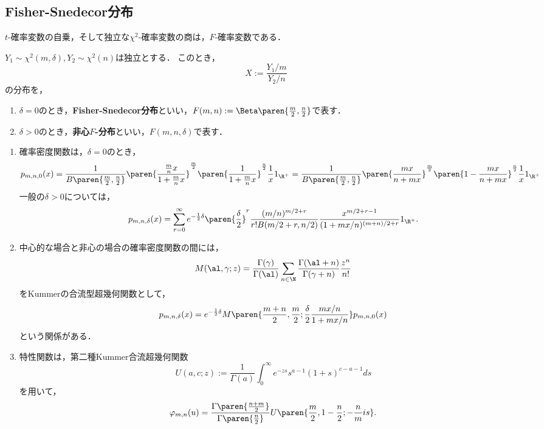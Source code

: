 \documentclass[uplatex,dvipdfmx]{jsreport}
\begin{document}
\subsection{Fisher-Snedecor分布}

\begin{tcolorbox}[colframe=ForestGreen, colback=ForestGreen!10!white,breakable,colbacktitle=ForestGreen!40!white,coltitle=black,fonttitle=\bfseries\sffamily,
title=]
    $t$-確率変数の自乗，そして独立な$\chi^2$-確率変数の商は，$F$-確率変数である．
\end{tcolorbox}

\begin{definition}
    $Y_1\sim\chi^2(m,\delta),Y_2\sim\chi^2(n)$は独立とする．
    このとき，
    \[X:=\frac{Y_1/m}{Y_2/n}\]
    の分布を，
    \begin{enumerate}
        \item $\delta=0$のとき，\textbf{Fisher-Snedecor分布}といい，$F(m,n):=\Beta\paren{\frac{m}{2},\frac{n}{2}}$で表す．
        \item $\delta>0$のとき，\textbf{非心$F$-分布}といい，$F(m,n,\delta)$で表す．
    \end{enumerate}
\end{definition}

\begin{proposition}[F-分布の特性値]\mbox{}
    \begin{enumerate}
        \item 確率密度関数は，$\delta=0$のとき，
        \[p_{m,n,0}(x)=\frac{1}{B\paren{\frac{m}{2},\frac{n}{2}}}\paren{\frac{\frac{m}{n}x}{1+\frac{m}{n}x}}^{\frac{m}{2}}\paren{\frac{1}{1+\frac{m}{n}x}}^{\frac{n}{2}}\frac{1}{x}1_{\R^+}=\frac{1}{B\paren{\frac{m}{2},\frac{n}{2}}}\paren{\frac{mx}{n+mx}}^{\frac{m}{2}}\paren{1-\frac{mx}{n+mx}}^{\frac{n}{2}}\frac{1}{x}1_{\R^+}\]
        一般の$\delta>0$については，
        \[p_{m,n,\delta}(x)=\sum_{r=0}^\infty e^{-\frac{1}{2}\delta}\paren{\frac{\delta}{2}}^r\frac{(m/n)^{m/2+r}}{r!B(m/2+r,n/2)}\frac{x^{m/2+r-1}}{(1+mx/n)^{(m+n)/2+r}}1_{\R^+}.\]
        \item 中心的な場合と非心の場合の確率密度関数の間には，
        \[M(\al,\gamma;z)=\frac{\Gamma(\gamma)}{\Gamma(\al)}\sum_{n\in\N}\frac{\Gamma(\al+n)}{\Gamma(\gamma+n)}\frac{z^n}{n!}\]
        をKummerの合流型超幾何関数として，
        \[p_{m,n,\delta}(x)=e^{-\frac{1}{2}\delta}M\paren{\frac{m+n}{2},\frac{m}{2};\frac{\delta}{2}\frac{mx/n}{1+mx/n}}p_{m,n,0}(x)\]
        という関係がある．
        \item 特性関数は，第二種Kummer合流超幾何関数
        \[U(a,c;z):=\frac{1}{\Gamma(a)}\int^\infty_0e^{-zs}s^{a-1}(1+s)^{c-a-1}ds\]
        を用いて，
        \[\varphi_{m,n}(u)=\frac{\Gamma\paren{\frac{n+m}{2}}}{\Gamma\paren{\frac{n}{2}}}U\paren{\frac{m}{2},1-\frac{n}{2};-\frac{n}{m}is}.\]
    \end{enumerate}
\end{proposition}
\end{document}
